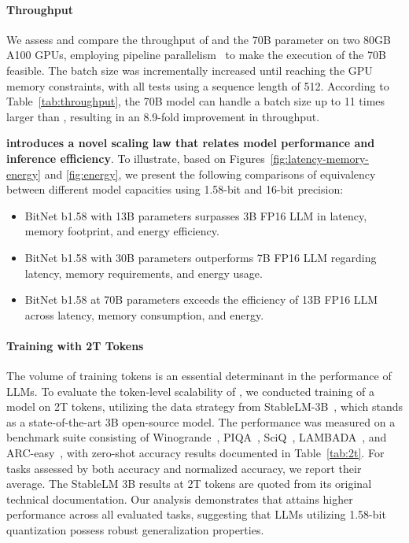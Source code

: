 \paragraph{Throughput}

We assess and compare the throughput of  and the 70B parameter  on two 80GB A100 GPUs, employing pipeline parallelism~\cite{gpipe} to make the execution of the  70B feasible. The batch size was incrementally increased until reaching the GPU memory constraints, with all tests using a sequence length of 512. According to Table~\ref{tab:throughput}, the 70B  model can handle a batch size up to 11 times larger than , resulting in an 8.9-fold improvement in throughput.

\textbf{ introduces a novel scaling law that relates model performance and inference efficiency}. To illustrate, based on Figures~\ref{fig:latency-memory-energy} and \ref{fig:energy}, we present the following comparisons of equivalency between different model capacities using 1.58-bit and 16-bit precision:

\begin{itemize}
    \item BitNet b1.58 with 13B parameters surpasses 3B FP16 LLM in latency, memory footprint, and energy efficiency.
    \item BitNet b1.58 with 30B parameters outperforms 7B FP16 LLM regarding latency, memory requirements, and energy usage.
    \item BitNet b1.58 at 70B parameters exceeds the efficiency of 13B FP16 LLM across latency, memory consumption, and energy.
\end{itemize}

\paragraph{Training with 2T Tokens}

The volume of training tokens is an essential determinant in the performance of LLMs. To evaluate the token-level scalability of , we conducted training of a  model on 2T tokens, utilizing the data strategy from StableLM-3B~\cite{StableLM-3B-4E1T}, which stands as a state-of-the-art 3B open-source model. The performance was measured on a benchmark suite consisting of Winogrande~\cite{winoGrande}, PIQA~\cite{piqa}, SciQ~\cite{sciq}, LAMBADA~\cite{lambada}, and ARC-easy~\cite{arc}, with zero-shot accuracy results documented in Table~\ref{tab:2t}. For tasks assessed by both accuracy and normalized accuracy, we report their average. The StableLM 3B results at 2T tokens are quoted from its original technical documentation. Our analysis demonstrates that  attains higher performance across all evaluated tasks, suggesting that LLMs utilizing 1.58-bit quantization possess robust generalization properties.

